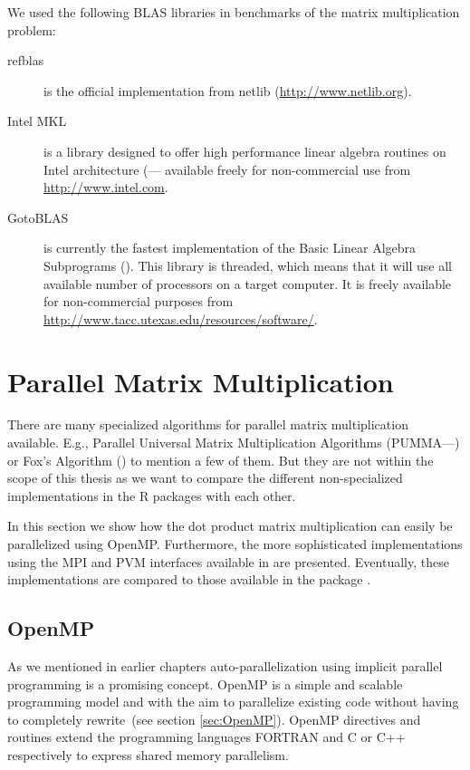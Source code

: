We used the following BLAS libraries in benchmarks of  the matrix
multiplication problem:

\begin{description}
\item[refblas] is the official implementation from netlib
  (\url{http://www.netlib.org}).
\item[Intel MKL] is a library designed to offer high performance
  linear algebra routines on
 Intel architecture (\cite{intel07MKL}--- available
  freely for non-commercial use from \url{http://www.intel.com}. 
\item[GotoBLAS] is currently the fastest implementation of the Basic
  Linear Algebra Subprograms (\cite{goto07gotoblas}). This library is
  threaded, which means that it will use all available number of
  processors on a target computer. It is freely available for
  non-commercial purposes from
  \url{http://www.tacc.utexas.edu/resources/software/}.
\end{description}



\section{Parallel Matrix Multiplication}
\label{sec:parmm}

There are many specialized algorithms for parallel matrix multiplication
available. E.g., Parallel Universal Matrix Multiplication Algorithms
(PUMMA---\cite{choi93pumma}) or Fox's Algorithm (\cite{fox87mah}) to
mention a few of them. But they are not within the scope of this thesis
as we want to compare the different non-specialized implementations in the
R packages with each other.

In this section we show how the dot product matrix multiplication can
easily be parallelized using OpenMP. Furthermore, the more
sophisticated implementations using the MPI and PVM interfaces
available in  are
presented. Eventually, these implementations are compared to those
available in the package .   

\subsection{OpenMP}

As we mentioned in earlier chapters auto-parallelization using
implicit parallel programming is a promising concept. OpenMP is a simple and
scalable programming model and with the aim to parallelize existing code
without having to completely rewrite~(see section
\ref{sec:OpenMP}). OpenMP directives and routines extend the
programming languages FORTRAN and C or C++ respectively to express
shared memory parallelism.

